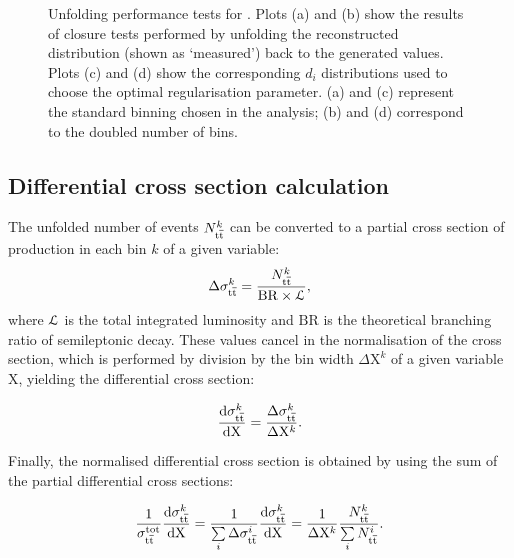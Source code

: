 \begin{figure}[hbtp]
    \caption[Unfolding performance tests for \MET]{Unfolding performance tests for \MET. Plots (a) and (b) show the
    results of closure tests performed by unfolding the reconstructed \MADGRAPH distribution (shown as `measured') back
    to the generated values. Plots (c) and (d) show the corresponding $d_i$ distributions used to choose the optimal
    regularisation parameter. (a) and (c) represent the standard binning chosen in the analysis; (b) and (d) correspond
    to the doubled number of \MET bins. }
    \label{fig:MET_SVD_tests}
\end{figure}

\subsection{Differential cross section calculation}
\label{ss_xsection:calculation}

The unfolded number of \ttbar events $N_{\mathrm{t}\overline{\mathrm{t}}}^k$ can be converted to a partial cross section of \ttbar production in
each bin $k$ of a given variable:
\begin{equation}
\label{eq:partial_xsection}
\Delta\sigma_{\mathrm{t}\overline{\mathrm{t}}}^k = \frac{N_{\mathrm{t}\overline{\mathrm{t}}}^k}{\mathrm{BR} \times {\cal L}},
\end{equation}
where $\cal L$ is the total integrated luminosity and $\mathrm{BR}$ is the theoretical branching ratio of semileptonic
\ttbar decay. These values cancel in the normalisation of the cross section, which is performed by division by the bin
width $\Delta \mathrm{X}^k$ of a given variable $\mathrm{X}$, yielding the differential cross section:

\begin{equation}
\label{eq:differential_xsection}
\frac{\mathrm{d}\sigma_{\mathrm{t}\overline{\mathrm{t}}}^k}{\mathrm{d} \mathrm{X}} = \frac{\Delta\sigma_{\mathrm{t}\overline{\mathrm{t}}}^k}{\Delta \mathrm{X}^k }.
\end{equation}

Finally, the normalised differential cross section is obtained by using the sum of the partial differential cross
sections:

\begin{equation}
\label{eq:normalised_differential_xsection}
\frac{1}{\sigma_{\mathrm{t}\overline{\mathrm{t}}}^\mathrm{tot}} \frac{\mathrm{d}\sigma_{\mathrm{t}\overline{\mathrm{t}}}^k}{\mathrm{d} \mathrm{X}} =
\frac{1}{\sum\limits_i{\Delta\sigma_{\mathrm{t}\overline{\mathrm{t}}}^i}} \frac{\mathrm{d}\sigma_{\mathrm{t}\overline{\mathrm{t}}}^k}{\mathrm{d}
\mathrm{X}} = \frac{1}{\Delta \mathrm{X}^k} \frac{N_{\mathrm{t}\overline{\mathrm{t}}}^k}{\sum\limits_i N_{\mathrm{t}\overline{\mathrm{t}}}^i}.
\end{equation}

